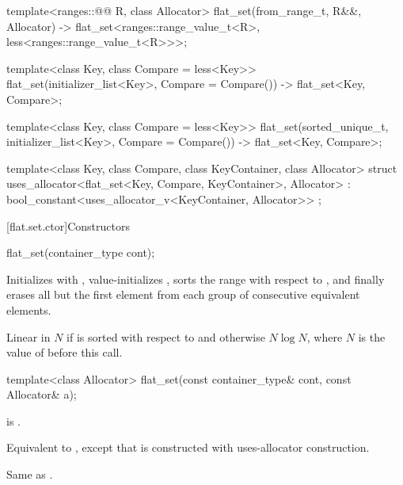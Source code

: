 \begin{codeblock}
{   template<ranges::@@ R, class Allocator>
     flat_set(from_range_t, R&&, Allocator)
       -> flat_set<ranges::range_value_t<R>, less<ranges::range_value_t<R>>>;

  template<class Key, class Compare = less<Key>>
    flat_set(initializer_list<Key>, Compare = Compare())
      -> flat_set<Key, Compare>;

  template<class Key, class Compare = less<Key>>
    flat_set(sorted_unique_t, initializer_list<Key>, Compare = Compare())
      -> flat_set<Key, Compare>;

  template<class Key, class Compare, class KeyContainer, class Allocator>
    struct uses_allocator<flat_set<Key, Compare, KeyContainer>, Allocator>
      : bool_constant<uses_allocator_v<KeyContainer, Allocator>> { };
}
\end{codeblock}

[flat.set.ctor]{Constructors}

%
\begin{itemdecl}
flat_set(container_type cont);
\end{itemdecl}

\begin{itemdescr}
\pnum
\effects
Initializes  with ,
value-initializes ,
sorts the range  with respect to , and
finally erases all but the first element
from each group of consecutive equivalent elements.

\pnum
\complexity
Linear in $N$ if  is sorted with respect to  and
otherwise $N \log N$, where $N$ is the value of  before this call.
\end{itemdescr}

%
\begin{itemdecl}
template<class Allocator>
  flat_set(const container_type& cont, const Allocator& a);
\end{itemdecl}

\begin{itemdescr}
\pnum
\constraints
{} is .

\pnum
\effects
Equivalent to ,
except that  is constructed with
uses-allocator construction.

\pnum
\complexity
Same as .
\end{itemdescr}

